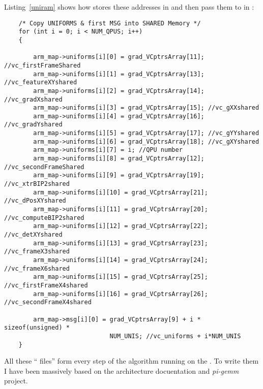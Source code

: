 Listing~\ref{uniram} shows how \cpu{} stores these addresses in \ram{} and then pass them to \vc{} in :
\begin{lstlisting}
    /* Copy UNIFORMS & first MSG into SHARED Memory */
    for (int i = 0; i < NUM_QPUS; i++)
    {

        arm_map->uniforms[i][0] = grad_VCptrsArray[11]; //vc_firstFrameShared
        arm_map->uniforms[i][1] = grad_VCptrsArray[13]; //vc_featureXYshared
        arm_map->uniforms[i][2] = grad_VCptrsArray[14]; //vc_gradXshared
        arm_map->uniforms[i][3] = grad_VCptrsArray[15]; //vc_gXXshared
        arm_map->uniforms[i][4] = grad_VCptrsArray[16]; //vc_gradYshared
        arm_map->uniforms[i][5] = grad_VCptrsArray[17]; //vc_gYYshared
        arm_map->uniforms[i][6] = grad_VCptrsArray[18]; //vc_gXYshared
        arm_map->uniforms[i][7] = i; //QPU number
        arm_map->uniforms[i][8] = grad_VCptrsArray[12]; //vc_secondFrameShared
        arm_map->uniforms[i][9] = grad_VCptrsArray[19]; //vc_xtrBIP2shared
        arm_map->uniforms[i][10] = grad_VCptrsArray[21]; //vc_dPosXYshared
        arm_map->uniforms[i][11] = grad_VCptrsArray[20]; //vc_computeBIP2shared
        arm_map->uniforms[i][12] = grad_VCptrsArray[22]; //vc_detXYshared
        arm_map->uniforms[i][13] = grad_VCptrsArray[23]; //vc_frameX3shared
        arm_map->uniforms[i][14] = grad_VCptrsArray[24]; //vc_frameX6shared
        arm_map->uniforms[i][15] = grad_VCptrsArray[25]; //vc_firstFrameX4shared
        arm_map->uniforms[i][16] = grad_VCptrsArray[26]; //vc_secondFrameX4shared

        arm_map->msg[i][0] = grad_VCptrsArray[9] + i * sizeof(unsigned) *
                             NUM_UNIS; //vc_uniforms + i*NUM_UNIS
    }
\end{lstlisting}


All these \enquote{ files} form every step of the \flow{} algorithm running on the \vc{}. To write them I have been massively based on the \vc{} architecture docuentation \parencite{refVC} and \emph{pi-gemm} project.
